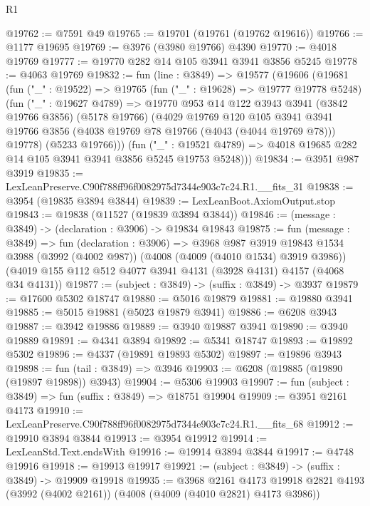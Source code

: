 \begin{lexlean}{R1}
\begin{coremodule}
@19762 := @7591 @49
@19765 := @19701 (@19761 (@19762 @19616))
@19766 := @1177 @19695
@19769 := @3976 (@3980 @19766) @4390
@19770 := @4018 @19769
@19777 := @19770 @282 @14 @105 @3941 @3941 @3856 @5245
@19778 := @4063 @19769
@19832 := fun (line : @3849) =>
  @19577
    (@19606
      (@19681
        (fun ("_" : @19522) =>
        @19765
          (fun ("_" : @19628) => @19777 @19778 @5248)
          (fun ("_" : @19627 @4789) =>
          @19770
            @953
            @14
            @122
            @3943
            @3941
            (@3842 @19766 @3856)
            (@5178 @19766)
            (@4029
              @19769
              @120
              @105
              @3941
              @3941
              @19766
              @3856
              (@4038 @19769 @78 @19766 (@4043 (@4044 @19769 @78)))
              @19778)
            (@5233 @19766)))
        (fun ("_" : @19521 @4789) =>
        @4018 @19685 @282 @14 @105 @3941 @3941 @3856 @5245 @19753 @5248)))
@19834 := @3951 @987 @3919
@19835 := LexLeanPreserve.C90f788ff96f0082975d7344e903c7c24.R1.__fits_31
@19838 := @3954 (@19835 @3894 @3844)
@19839 := LexLeanBoot.AxiomOutput.stop
@19843 := @19838 (@11527 (@19839 @3894 @3844))
@19846 := (message : @3849) -> (declaration : @3906) -> @19834 @19843
@19875 := fun (message : @3849) =>
  fun (declaration : @3906) =>
  @3968
    @987
    @3919
    @19843
    @1534
    @3988
    (@3992 (@4002 @987))
    (@4008 (@4009 (@4010 @1534) @3919 @3986))
    (@4019 @155 @112 @512 @4077 @3941 @4131 (@3928 @4131) @4157 (@4068 @34 @4131))
@19877 := (subject : @3849) -> (suffix : @3849) -> @3937
@19879 := @17600 @5302 @18747
@19880 := @5016 @19879
@19881 := @19880 @3941
@19885 := @5015 @19881 (@5023 @19879 @3941)
@19886 := @6208 @3943
@19887 := @3942 @19886
@19889 := @3940 @19887 @3941
@19890 := @3940 @19889
@19891 := @4341 @3894
@19892 := @5341 @18747
@19893 := @19892 @5302
@19896 := @4337 (@19891 @19893 @5302)
@19897 := @19896 @3943
@19898 := fun (tail : @3849) => @3946
@19903 := @6208 (@19885 (@19890 (@19897 @19898)) @3943)
@19904 := @5306 @19903
@19907 := fun (subject : @3849) => fun (suffix : @3849) => @18751 @19904
@19909 := @3951 @2161 @4173
@19910 := LexLeanPreserve.C90f788ff96f0082975d7344e903c7c24.R1.__fits_68
@19912 := @19910 @3894 @3844
@19913 := @3954 @19912
@19914 := LexLeanStd.Text.endsWith
@19916 := @19914 @3894 @3844
@19917 := @4748 @19916
@19918 := @19913 @19917
@19921 := (subject : @3849) -> (suffix : @3849) -> @19909 @19918
@19935 := @3968
    @2161
    @4173
    @19918
    @2821
    @4193
    (@3992 (@4002 @2161))
    (@4008 (@4009 (@4010 @2821) @4173 @3986))

\end{coremodule}
\end{lexlean}
